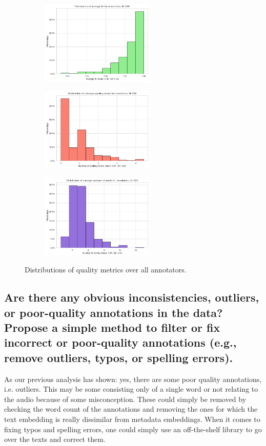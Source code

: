 \begin{figure}[htbp]
  \centering
  \begin{subfigure}[b]{0.33\textwidth}
    \includegraphics[width=\textwidth, height=4cm]{figs/ttr_dist.png}
  \end{subfigure}
  \hfill
  \begin{subfigure}[b]{0.33\textwidth}
    \includegraphics[width=\textwidth, height=4cm]{figs/error_dist.png}
  \end{subfigure}
  \hfill
  \begin{subfigure}[b]{0.33\textwidth}
    \includegraphics[width=\textwidth, height=4cm]{figs/word_dist.png}
  \end{subfigure}
  \caption{Distributions of quality metrics over all annotators.}
  \label{fig:2_d}
\end{figure}

\subsection{Are there any obvious inconsistencies, outliers, or poor-quality annotations in the data? Propose a
simple method to filter or fix incorrect or poor-quality annotations (e.g., remove outliers, typos, or
spelling errors).}
\label{sec:Annotation Quality:c2}
As our previous analysis has shown: yes, there are some poor quality annotations, i.e. outliers. This may be some consisting only of a single word or not relating to the audio because of some misconception. 
These could simply be removed by checking the word count of the annotations and removing the ones for which the text embedding is really dissimilar from metadata embeddings.
When it comes to fixing typos and spelling errors, one could simply use an off-the-shelf library to go over the texts and correct them.

